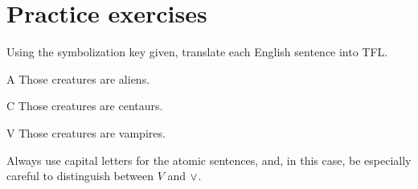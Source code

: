 









\section{Practice exercises}
\setcounter{ProbPart}{0}

\problempart Using the symbolization key given, translate each English sentence into TFL.\label{pr.monkeysuits}
	\begin{ekey}
		\item[A] Those creatures are aliens. 
		\item[C] Those creatures are centaurs. 
		\item[V] Those creatures are vampires.
	\end{ekey}
Always use capital letters for the atomic sentences, and, in this case, be especially careful to distinguish between $V$ and $\vee$.

